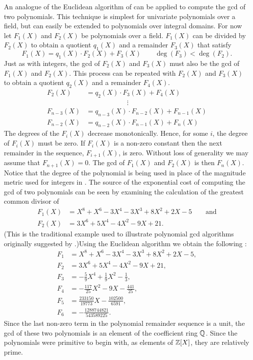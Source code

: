 An analogue of the Euclidean algorithm of
 can be applied to compute the {\sc gcd} of
two polynomials. This technique is simplest for univariate polynomials
over a field, but can easily be extended to polynomials over integral
domains.  For now let $F_1(X)$ and $F_2(X)$ be polynomials over a
field.  $F_1(X)$ can be divided by $F_2(X)$ to obtain a quotient
$q_1(X)$ and a remainder $F_3(X)$ that satisfy
\begin{equation}
F_1(X) = q_1(X)\cdot F_2(X) + F_3(X) \qquad \deg(F_3) < \deg(F_2).
\label{Poly:Remainder:Eq}
\end{equation}
Just as with integers, the {\sc gcd} of $F_2(X)$ and $F_3(X)$ must also be the
{\sc gcd} of $F_1(X)$ and $F_2(X)$. This process can be repeated with $F_2(X)$
and $F_3(X)$ to obtain a quotient $q_2(X)$ and a remainder $F_4(X)$. 
\[
\begin{aligned}
  F_2(X) &= q_2(X)\cdot F_3(X) + F_4(X) \\
     &\qquad\qquad\qquad\vdots\\
  F_{n-3}(X) &= q_{n-3}(X)\cdot F_{n-2}(X) + F_{n-1}(X)\\
  F_{n-2}(X) &= q_{n-2}(X)\cdot F_{n-1}(X) + F_{n}(X)
\end{aligned}
\]
The degrees of the $F_i(X)$ decrease monotonically.  Hence, for some
$i$, the degree of $F_i(X)$ must be zero.  If $F_i(X)$ is a non-zero
constant then the next remainder in the sequence, $F_{i+1}(X)$, is
zero.  Without loss of generality we may assume that $F_{n+1}(X) = 0$.
The {\sc gcd} of $F_1(X)$ and $F_2(X)$ is then $F_n(X)$.  Notice that
the degree of the polynomial is being used in place of the magnitude
metric used for integers in .  
The source of the exponential cost of computing the {\sc gcd} of two
polynomials can be seen by examining the calculation of the greatest
common divisor of
\[
\begin{aligned}
F_1(X)&= X^8 + X^6 - 3 X^4 - 3 X^3 + 8X^2 + 2X -5 
\qquad \mbox{and}\\
F_2(X)&= 3X^6 + 5X^4 - 4X^2 - 9X + 21.
\end{aligned}
\]
(This is the traditional example used to illustrate polynomial {\sc gcd}
algorithms originally suggested by {\Knuth} \cite{Knuth:II}.)\enspace Using
the Euclidean algorithm we obtain the following :
\[
\begin{aligned}
  F_{1} & = X^8 + X^6 - 3 X^4 - 3 X^3 + 8X^2 + 2X -5, \\
  F_{2} & = 3X^6 + 5X^4 - 4X^2 - 9X + 21, \\
  F_{3} & = -\frac{5}{9}X^4 + \frac{1}{9}X^2 - \frac{1}{3}, \\
  F_{4} & = -\frac{117}{25}X^2 - 9 X - \frac{441}{25}, \\
  F_{5} & = \frac{233150}{19773}X - \frac{102500}{6591}, \\
  F_{6} & = -\frac{1288744821}{543589225}.
\end{aligned}
\]
Since the last non-zero term in the polynomial remainder sequence is a
unit, the {\sc gcd} of these two polynomials is an element of the coefficient
ring $\mathbb{Q}$.  Since the polynomials were primitive to begin with, as elements
of $\mathbb{Z}[X]$, they are relatively prime.

